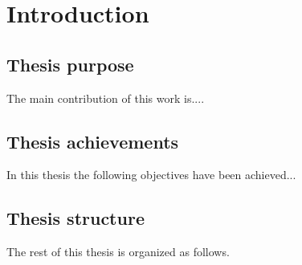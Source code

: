 \chapter{Introduction}

\section{Thesis purpose}

The main contribution of this work is.... 


\section{Thesis achievements}
In this thesis the following objectives have been achieved...


\section{Thesis structure}
The rest of this thesis is organized as follows.

